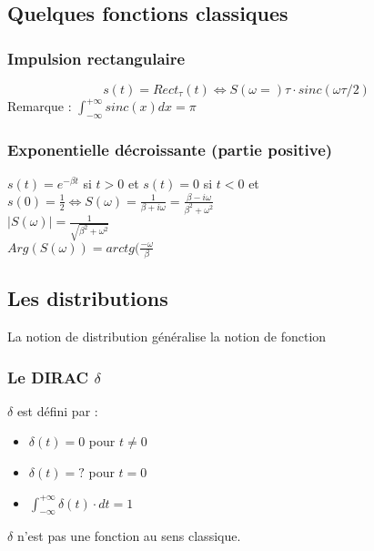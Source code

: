 \documentclass[10pt,a4paper,twoside]{article}
\begin{document}
\subsection{Quelques fonctions classiques}
\subsubsection{Impulsion rectangulaire}
$$s(t)=Rect_{\tau}(t) \Leftrightarrow S(\omega= ) \tau\cdot sinc(\omega\tau/2)$$
Remarque : $\int_{-\infty}^{+\infty}sinc(x)dx = \pi$

\subsubsection{Exponentielle décroissante (partie positive)}
$s(t)=e^{-\beta t}$ si $t>0$ et $s(t)=0$ si $t<0$ et $s(0)=\frac{1}{2} \Leftrightarrow S(\omega)=\frac{1}{\beta+i\omega}=\frac{\beta-i\omega}{\beta^{2}+\omega^{2}}$\\
$|S(\omega)| = \frac{1}{\sqrt{\beta^{2}+\omega^{2}}}$\\
$Arg(S(\omega))=arctg(\frac{-\omega}{\beta}$

\subsection{Les distributions}
La notion de distribution généralise la notion de fonction
\subsubsection{Le DIRAC $\delta$}
$\delta$ est défini par :
\begin{itemize}
\item $\delta(t)=0$ pour $t\neq0$
\item $\delta(t)=?$ pour $t=0$
\item $\int_{-\infty}^{+\infty}\delta(t)\cdot dt=1$
\end{itemize}
$\delta$ n'est pas une fonction au sens classique.
\end{document}
